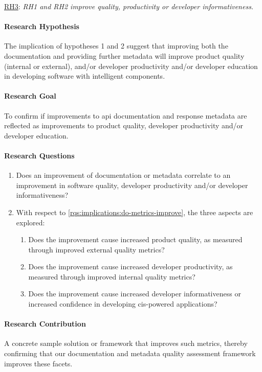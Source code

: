 \begin{titled-frame}{\underline{RH3}: \textit{RH1 and RH2 improve quality,  productivity or developer informativeness.} }
\vspace{-12pt}
\paragraph{Research Hypothesis}
The implication of hypotheses 1 and 2 suggest that improving both the documentation and providing further metadata will improve product quality (internal or external), and/or developer productivity and/or developer education in developing software with intelligent components.

\paragraph{Research Goal}
 To confirm if improvements to \gls{api} documentation and response metadata  are reflected as improvements to product quality, developer productivity and/or developer education.

\paragraph{Research Questions}
\begin{enumerate}[label=\textbf{RQ3.\arabic*.}, ref=RQ3.\arabic*, leftmargin=3.5\parindent, rightmargin=1\parindent]
  \item  Does an improvement of documentation or metadata correlate to an improvement in software quality, developer productivity and/or developer informativeness?
  \label{rqs:implications:do-metrics-improve}
  
  \item With respect to \ref{rqs:implications:do-metrics-improve}, the three aspects are explored:
  \begin{enumerate}
  \item Does the improvement cause increased product quality, as measured through improved external quality metrics?
  \item Does the improvement cause increased developer productivity, as measured through improved internal quality metrics?
  \item Does the improvement cause increased developer informativeness or increased confidence in developing \gls{cis}-powered applications?
  \end{enumerate}
  \label{rqs:implications:aspects}  
\end{enumerate}

\paragraph{Research Contribution}
A concrete sample solution or framework that improves such metrics, thereby confirming that our documentation and metadata quality assessment framework improves these facets.
\end{titled-frame}


